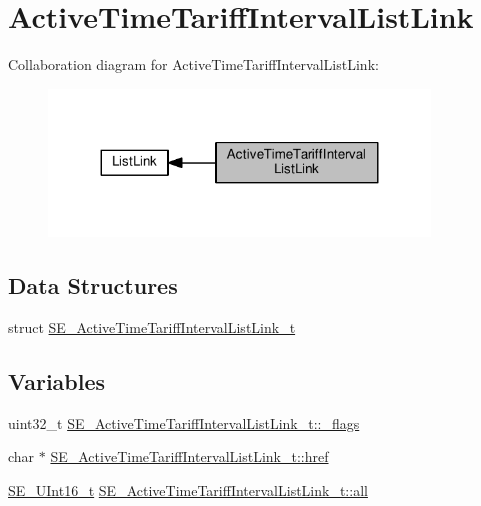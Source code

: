 \hypertarget{group__ActiveTimeTariffIntervalListLink}{}\section{Active\+Time\+Tariff\+Interval\+List\+Link}
\label{group__ActiveTimeTariffIntervalListLink}
Collaboration diagram for Active\+Time\+Tariff\+Interval\+List\+Link\+:\nopagebreak
\begin{figure}[H]
\begin{center}
\leavevmode
\includegraphics[width=287pt]{group__ActiveTimeTariffIntervalListLink}
\end{center}
\end{figure}
\subsection*{Data Structures}
\begin{DoxyCompactItemize}
\item 
struct \hyperlink{structSE__ActiveTimeTariffIntervalListLink__t}{S\+E\+\_\+\+Active\+Time\+Tariff\+Interval\+List\+Link\+\_\+t}
\end{DoxyCompactItemize}
\subsection*{Variables}
\begin{DoxyCompactItemize}
\item 
uint32\+\_\+t \hyperlink{group__ActiveTimeTariffIntervalListLink_gae4afe7d01ef64164fb20d662e4447095}{S\+E\+\_\+\+Active\+Time\+Tariff\+Interval\+List\+Link\+\_\+t\+::\+\_\+flags}
\item 
char $\ast$ \hyperlink{group__ActiveTimeTariffIntervalListLink_ga1feb971d205d4f4f6e5fff8067e12a08}{S\+E\+\_\+\+Active\+Time\+Tariff\+Interval\+List\+Link\+\_\+t\+::href}
\item 
\hyperlink{group__UInt16_gac68d541f189538bfd30cfaa712d20d29}{S\+E\+\_\+\+U\+Int16\+\_\+t} \hyperlink{group__ActiveTimeTariffIntervalListLink_ga155419b00dbfbeda38b3b4a8a06f2b16}{S\+E\+\_\+\+Active\+Time\+Tariff\+Interval\+List\+Link\+\_\+t\+::all}
\end{DoxyCompactItemize}


